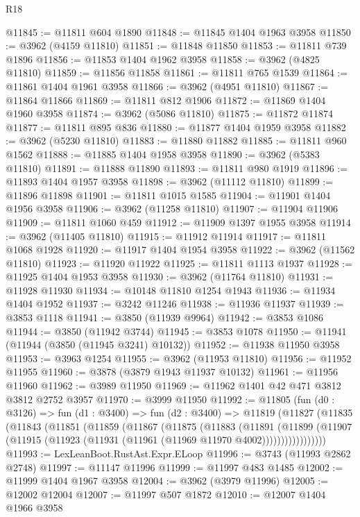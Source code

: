 \begin{lexlean}{R18}
\begin{coremodule}
@11845 := @11811 @604 @1890
@11848 := @11845 @1404 @1963 @3958
@11850 := @3962 (@4159 @11810)
@11851 := @11848 @11850
@11853 := @11811 @739 @1896
@11856 := @11853 @1404 @1962 @3958
@11858 := @3962 (@4825 @11810)
@11859 := @11856 @11858
@11861 := @11811 @765 @1539
@11864 := @11861 @1404 @1961 @3958
@11866 := @3962 (@4951 @11810)
@11867 := @11864 @11866
@11869 := @11811 @812 @1906
@11872 := @11869 @1404 @1960 @3958
@11874 := @3962 (@5086 @11810)
@11875 := @11872 @11874
@11877 := @11811 @895 @836
@11880 := @11877 @1404 @1959 @3958
@11882 := @3962 (@5230 @11810)
@11883 := @11880 @11882
@11885 := @11811 @960 @1562
@11888 := @11885 @1404 @1958 @3958
@11890 := @3962 (@5383 @11810)
@11891 := @11888 @11890
@11893 := @11811 @980 @1919
@11896 := @11893 @1404 @1957 @3958
@11898 := @3962 (@11112 @11810)
@11899 := @11896 @11898
@11901 := @11811 @1015 @1585
@11904 := @11901 @1404 @1956 @3958
@11906 := @3962 (@11258 @11810)
@11907 := @11904 @11906
@11909 := @11811 @1060 @459
@11912 := @11909 @1397 @1955 @3958
@11914 := @3962 (@11405 @11810)
@11915 := @11912 @11914
@11917 := @11811 @1068 @1928
@11920 := @11917 @1404 @1954 @3958
@11922 := @3962 (@11562 @11810)
@11923 := @11920 @11922
@11925 := @11811 @1113 @1937
@11928 := @11925 @1404 @1953 @3958
@11930 := @3962 (@11764 @11810)
@11931 := @11928 @11930
@11934 := @10148 @11810 @1254 @1943
@11936 := @11934 @1404 @1952
@11937 := @3242 @11246
@11938 := @11936 @11937
@11939 := @3853 @1118
@11941 := @3850 (@11939 @9964)
@11942 := @3853 @1086
@11944 := @3850 (@11942 @3744)
@11945 := @3853 @1078
@11950 := @11941 (@11944 (@3850 (@11945 @3241) @10132))
@11952 := @11938 @11950 @3958
@11953 := @3963 @1254
@11955 := @3962 (@11953 @11810)
@11956 := @11952 @11955
@11960 := @3878 (@3879 @1943 @11937 @10132)
@11961 := @11956 @11960
@11962 := @3989 @11950
@11969 := @11962 @1401 @42 @471 @3812 @3812 @2752 @3957
@11970 := @3999 @11950
@11992 := @11805
    (fun (d0 : @3126) =>
    fun (d1 : @3400) =>
    fun (d2 : @3400) =>
    @11819
      (@11827
        (@11835
          (@11843
            (@11851
              (@11859
                (@11867
                  (@11875
                    (@11883
                      (@11891
                        (@11899
                          (@11907
                            (@11915 (@11923 (@11931 (@11961 (@11969 @11970 @4002)))))))))))))))))
@11993 := LexLeanBoot.RustAst.Expr.ELoop
@11996 := @3743 (@11993 @2862 @2748)
@11997 := @11147 @11996
@11999 := @11997 @483 @1485
@12002 := @11999 @1404 @1967 @3958
@12004 := @3962 (@3979 @11996)
@12005 := @12002 @12004
@12007 := @11997 @507 @1872
@12010 := @12007 @1404 @1966 @3958

\end{coremodule}
\end{lexlean}
